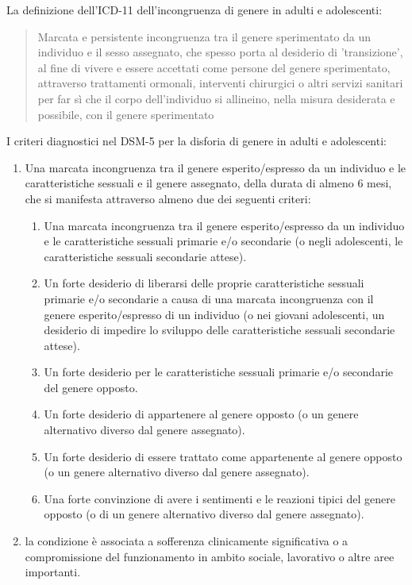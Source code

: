 \documentclass[12pt]{article}
\begin{document}
La definizione dell'ICD-11 dell'incongruenza di genere in adulti e adolescenti:

\begin{quote}
Marcata e persistente incongruenza tra il genere sperimentato da un individuo e il sesso assegnato, che spesso porta al desiderio di 'transizione', al fine di vivere e essere accettati come persone del genere  sperimentato, attraverso trattamenti ormonali, interventi chirurgici o altri servizi sanitari per far sì che il corpo dell'individuo si allineino, nella misura desiderata e possibile, con il genere sperimentato
\end{quote}

I criteri diagnostici nel DSM-5 per la disforia di genere in adulti e adolescenti:
\begin{enumerate}
\item Una marcata incongruenza tra il genere esperito/espresso da un individuo e  le caratteristiche sessuali e il genere assegnato, della durata di almeno 6 mesi, che si  manifesta attraverso almeno due dei seguenti criteri:
\begin{enumerate}
\item Una marcata incongruenza tra il genere esperito/espresso da un individuo e le  caratteristiche sessuali primarie e/o secondarie (o negli adolescenti, le  caratteristiche sessuali secondarie attese).
\item Un forte desiderio di liberarsi delle proprie caratteristiche sessuali primarie e/o  secondarie  a  causa  di  una  marcata  incongruenza  con  il  genere  esperito/espresso di un individuo (o nei giovani adolescenti, un desiderio di  impedire lo sviluppo delle caratteristiche sessuali secondarie attese).
\item Un forte desiderio per le caratteristiche sessuali primarie e/o secondarie del  genere opposto.
\item Un forte desiderio di appartenere al genere opposto (o un genere alternativo  diverso dal genere assegnato).
\item Un forte desiderio di essere trattato come appartenente al genere opposto (o un  genere alternativo diverso dal genere assegnato).
\item Una forte convinzione di avere i sentimenti e le reazioni tipici del genere opposto  (o di un genere alternativo diverso dal genere assegnato).
\end{enumerate}
\item la condizione è associata a sofferenza clinicamente significativa o a  compromissione del funzionamento in ambito sociale, lavorativo o altre aree  importanti.
\end{enumerate}
\end{document}

